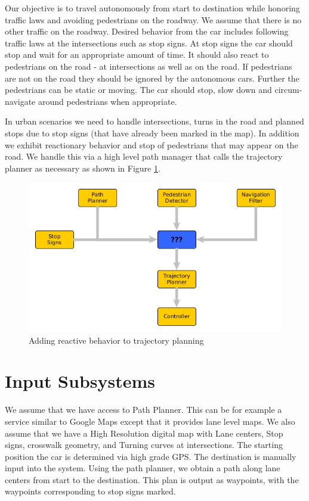 \documentclass[letterpaper, 10 pt, conference]{ieeeconf}  %
\begin{document}
Our objective is to travel autonomously from start to destination while honoring traffic laws and avoiding pedestrians on the roadway. We assume that there is no other traffic on the roadway. Desired behavior from the car includes following traffic laws at the intersections such as stop signs. At stop signs the car should stop and wait for an appropriate amount of time. It should also react to pedestrians on the road - at intersections as well as on the road. If pedestrians are not on the road they should be ignored by the autonomous cars. Further the pedestrians can be static or moving. The car should stop, slow down and circum-navigate around pedestrians when appropriate.


In urban scenarios we need to handle intersections, turns in the road and planned stops due 
to stop signs (that have already been marked in the map). In addition we exhibit reactionary 
behavior and stop of pedestrians that may appear on the road. We handle this via a high 
level path manager that calls the trajectory planner as necessary as shown in Figure \ref{fig:addreact}.

\begin{figure}[thpb]
  \centering
  \includegraphics[width=1.0\columnwidth]{graphics/MissingReactionPiece2.png}
  \caption{Adding reactive behavior to trajectory planning}
  \label{fig:addreact}
\end{figure}
					


\section{Input Subsystems} \label{sec:inputsubsystems}

We assume that we have access to Path Planner. This can be for example a service similar to
Google Maps except that it provides lane level maps. We also assume that we have a High
Resolution digital map with Lane centers, Stop signs, crosswalk geometry, and Turning 
curves at intersections. The starting position the 
car is determined via high grade GPS. The destination is manually input into the system.
Using the path planner, we obtain a path along lane centers from start to the destination.
This plan is output as waypoints, with the waypoints corresponding to stop signs marked.
\end{document}
